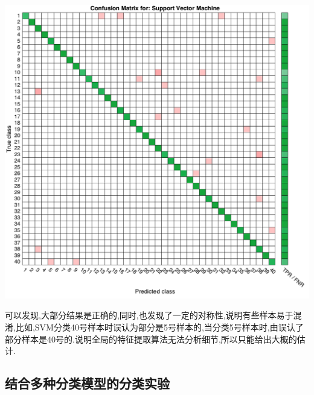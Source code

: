 	\begin{center}
	\begin{minipage}[t]{\linewidth}
	\center
	{
	\includegraphics[width=\textwidth]{Img/svm_confuse} 
	}
	\end{minipage}
	\medskip
	\end{center}
	可以发现,大部分结果是正确的,同时,也发现了一定的对称性,说明有些样本易于混淆,比如,SVM分类40号样本时误认为部分是5号样本的,当分类5号样本时,由误认了部分样本是40号的.说明全局的特征提取算法无法分析细节,所以只能给出大概的估计.
	

\subsection{结合多种分类模型的分类实验}


